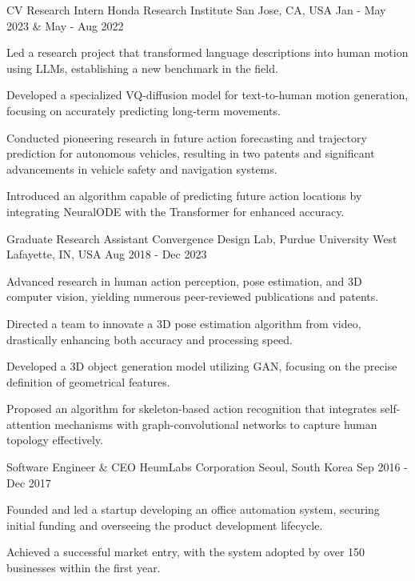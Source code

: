 \begin{cventries}
\cventry
{CV Research Intern} %
{Honda Research Institute} %
{San Jose, CA, USA} %
{Jan - May 2023 \& May - Aug 2022} %
{ %
\begin{cvitems}
    \item Led a research project that transformed language descriptions into human motion using LLMs, establishing a new benchmark in the field.
    \item Developed a specialized VQ-diffusion model for text-to-human motion generation, focusing on accurately predicting long-term movements.
    \item Conducted pioneering research in future action forecasting and trajectory prediction for autonomous vehicles, resulting in two patents and significant advancements in vehicle safety and navigation systems.
    \item Introduced an algorithm capable of predicting future action locations by integrating NeuralODE with the Transformer for enhanced accuracy.
\end{cvitems}
}

\cventry
{Graduate Research Assistant} %
{Convergence Design Lab, Purdue University} %
{West Lafayette, IN, USA} %
{Aug 2018 - Dec 2023} %
{ %
\begin{cvitems}
    \item Advanced research in human action perception, pose estimation, and 3D computer vision, yielding numerous peer-reviewed publications and patents.
    \item Directed a team to innovate a 3D pose estimation algorithm from video, drastically enhancing both accuracy and processing speed.
    \item Developed a 3D object generation model utilizing GAN, focusing on the precise definition of geometrical features.
    \item Proposed an algorithm for skeleton-based action recognition that integrates self-attention mechanisms with graph-convolutional networks to capture human topology effectively.
\end{cvitems}
}

\cventry
{Software Engineer \& CEO} %
{HeumLabs Corporation} %
{Seoul, South Korea} %
{Sep 2016 - Dec 2017} %
{ %
\begin{cvitems}
    \item Founded and led a startup developing an office automation system, securing initial
        funding and overseeing the product development lifecycle.
    \item Achieved a successful market entry, with the system adopted by over 150 businesses within the first year.
\end{cvitems}
}


\end{cventries}
